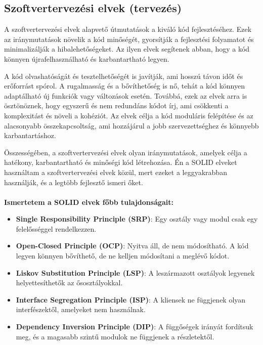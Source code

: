 \subsection*{Szoftvertervezési elvek (tervezés)}
A szoftvertervezési elvek alapvető útmutatások a kiváló kód fejlesztéséhez. Ezek az iránymutatások növelik a kód minőségét, gyorsítják a fejlesztési folyamatot és minimalizálják a hibalehetőségeket. Az ilyen elvek segítenek abban, hogy a kód könnyen újrafelhasználható és karbantartható legyen.

A kód olvashatóságát és tesztelhetőségét is javítják, ami hosszú távon időt és erőforrást spórol. A rugalmasság és a bővíthetőség is nő, tehát a kód könnyen adaptálható új funkciók vagy változások esetén. Továbbá, ezek az elvek arra is ösztönöznek, hogy egyszerű és nem redundáns kódot írj, ami csökkenti a komplexitást és növeli a kohéziót. Az elvek célja a kód moduláris felépítése és az alacsonyabb összekapcsoltság, ami hozzájárul a jobb szervezettséghez és könnyebb karbantartáshoz.

Összességében, a szoftvertervezési elvek olyan iránymutatások, amelyek célja a hatékony, karbantartható és minőségi kód létrehozása.
Én a SOLID elveket használtam a szoftvertervezési elvek közül, mert ezeket a leggyakrabban használják, és a legtöbb fejlesztő ismeri őket.
\\
\\
\textbf{Ismertetem a SOLID elvek főbb tulajdonságait:}
\begin{itemize}
    \item \textbf{Single Responsibility Principle (SRP)}: Egy osztály vagy modul csak egy felelősséggel rendelkezzen.
    \item \textbf{Open-Closed Principle (OCP)}: Nyitva áll, de nem módosítható. A kód legyen könnyen bővíthető, de ne kelljen módosítani a meglévő kódot.
    \item \textbf{Liskov Substitution Principle (LSP)}: A leszármazott osztályok legyenek helyettesíthetők az ősosztályokkal.
    \item \textbf{Interface Segregation Principle (ISP)}: A kliensek ne függjenek olyan interfészektől, amelyeket nem használnak.
    \item \textbf{Dependency Inversion Principle (DIP)}: A függőségek irányát fordítsuk meg, és a magasabb szintű modulok ne függjenek a részletektől.
\end{itemize}
